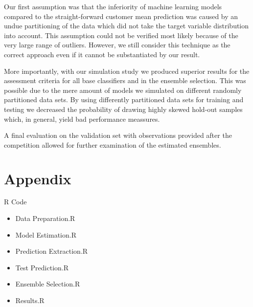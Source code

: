 Our first assumption was that the inferiority of machine learning models compared to the straight-forward customer mean prediction was caused by an undue partitioning of the data which did not take the target variable distribution into account. This assumption could not be verified most likely because of the very large range of outliers. However, we still consider this technique as the correct approach even if it cannot be substantiated by our result.

More importantly, with our simulation study we produced superior results for the assessment criteria for all base classifiers and in the ensemble selection. This was possible due to the mere amount of models we simulated on different randomly partitioned data sets. By using differently partitioned data sets for training and testing we decreased the probability of drawing highly skewed hold-out samples which, in general, yield bad performance meassures.

A final evaluation on the validation set with observations provided after the competition allowed for further examination of the estimated ensembles.\\

\nocite{Caruana2006}
\nocite{Niculescu-Mizil2009}

\newpage
\appendix
\section{Appendix}
R Code

\begin{itemize}
	\item Data Preparation.R
    \item Model Estimation.R
    \item Prediction Extraction.R
    \item Test Prediction.R
    \item Ensemble Selection.R
    \item Results.R
\end{itemize}

\newpage

\newpage

\newpage

\newpage

\newpage

\newpage


\newpage



